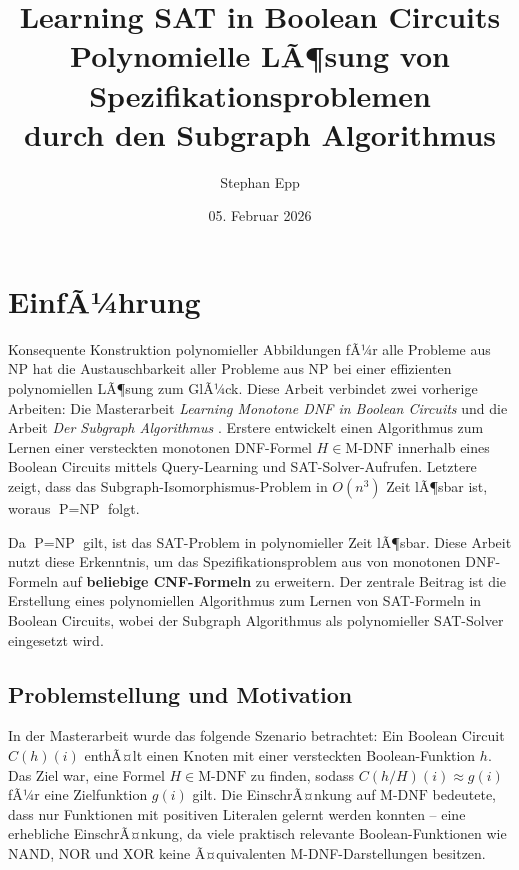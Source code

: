 ﻿\documentclass[a4paper,12pt]{article}
\title{\textbf{Learning SAT in Boolean Circuits}\\[0.5ex]
	\large Polynomielle LÃ¶sung von Spezifikationsproblemen\\durch den Subgraph Algorithmus}
\author{Stephan Epp}
\date{05. Februar 2026}
\theoremstyle{definition}
\begin{document}
\maketitle

\tableofcontents
\newpage

\section{EinfÃ¼hrung}
Konsequente Konstruktion polynomieller Abbildungen fÃ¼r alle Probleme aus NP hat die Austauschbarkeit aller Probleme aus NP bei einer effizienten polynomiellen LÃ¶sung zum GlÃ¼ck. Diese Arbeit verbindet zwei vorherige Arbeiten: Die Masterarbeit \textit{Learning Monotone DNF in Boolean Circuits} \cite{Epp13} und die Arbeit \textit{Der Subgraph Algorithmus} \cite{Epp26}. Erstere entwickelt einen Algorithmus zum Lernen einer versteckten monotonen DNF-Formel $H \in \text{M-DNF}$ innerhalb eines Boolean Circuits mittels Query-Learning und SAT-Solver-Aufrufen. Letztere zeigt, dass das Subgraph-Isomorphismus-Problem in $O(n^3)$ Zeit lÃ¶sbar ist, woraus $\text{P} = \text{NP}$ folgt.

Da $\text{P} = \text{NP}$ gilt, ist das SAT-Problem in polynomieller Zeit lÃ¶sbar. Diese Arbeit nutzt diese Erkenntnis, um das Spezifikationsproblem aus \cite{Epp13} von monotonen DNF-Formeln auf \textbf{beliebige CNF-Formeln} zu erweitern. Der zentrale Beitrag ist die Erstellung eines polynomiellen Algorithmus zum Lernen von SAT-Formeln in Boolean Circuits, wobei der Subgraph Algorithmus als polynomieller SAT-Solver eingesetzt wird.

\subsection{Problemstellung und Motivation}

In der Masterarbeit \cite{Epp13} wurde das folgende Szenario betrachtet: Ein Boolean Circuit $C(h)(i)$ enthÃ¤lt einen Knoten mit einer versteckten Boolean-Funktion $h$. Das Ziel war, eine Formel $H \in \text{M-DNF}$ zu finden, sodass $C(h/H)(i) \approx g(i)$ fÃ¼r eine Zielfunktion $g(i)$ gilt. Die EinschrÃ¤nkung auf $\text{M-DNF}$ bedeutete, dass nur Funktionen mit positiven Literalen gelernt werden konnten -- eine erhebliche EinschrÃ¤nkung, da viele praktisch relevante Boolean-Funktionen wie NAND, NOR und XOR keine Ã¤quivalenten M-DNF-Darstellungen besitzen.
\end{document}
